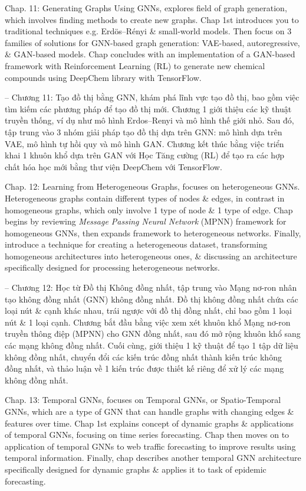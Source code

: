 \documentclass{article}
\begin{document}
\begin{itemize}
\begin{itemize}
        Chap. 11: Generating Graphs Using GNNs, explores field of graph generation, which involves finding methods to create new graphs. Chap 1st introduces you to traditional techniques e.g. Erd\"os--R\'enyi \& small-world models. Then focus on 3 families of solutions for GNN-based graph generation: VAE-based, autoregressive, \& GAN-based models. Chap concludes with an implementation of a GAN-based framework with Reinforcement Learning (RL) to generate new chemical compounds using DeepChem library with TensorFlow.

        -- Chương 11: Tạo đồ thị bằng GNN, khám phá lĩnh vực tạo đồ thị, bao gồm việc tìm kiếm các phương pháp để tạo đồ thị mới. Chương 1 giới thiệu các kỹ thuật truyền thống, ví dụ như mô hình Erdos--Renyi và mô hình thế giới nhỏ. Sau đó, tập trung vào 3 nhóm giải pháp tạo đồ thị dựa trên GNN: mô hình dựa trên VAE, mô hình tự hồi quy và mô hình GAN. Chương kết thúc bằng việc triển khai 1 khuôn khổ dựa trên GAN với Học Tăng cường (RL) để tạo ra các hợp chất hóa học mới bằng thư viện DeepChem với TensorFlow.

        Chap. 12: Learning from Heterogeneous Graphs, focuses on heterogeneous GNNs. Heterogeneous graphs contain different types of nodes \& edges, in contrast in homogeneous graphs, which only involve 1 type of node \& 1 type of edge. Chap begins by reviewing {\it Message Passing Neural Network} (MPNN) framework for homogeneous GNNs, then expands framework to heterogeneous networks. Finally, introduce a technique for creating a heterogeneous dataset, transforming homogeneous architectures into heterogeneous ones, \& discussing an architecture specifically designed for processing heterogeneous networks.

        -- Chương 12: Học từ Đồ thị Không đồng nhất, tập trung vào Mạng nơ-ron nhân tạo không đồng nhất (GNN) không đồng nhất. Đồ thị không đồng nhất chứa các loại nút \& cạnh khác nhau, trái ngược với đồ thị đồng nhất, chỉ bao gồm 1 loại nút \& 1 loại cạnh. Chương bắt đầu bằng việc xem xét khuôn khổ Mạng nơ-ron truyền thông điệp (MPNN) cho GNN đồng nhất, sau đó mở rộng khuôn khổ sang các mạng không đồng nhất. Cuối cùng, giới thiệu 1 kỹ thuật để tạo 1 tập dữ liệu không đồng nhất, chuyển đổi các kiến trúc đồng nhất thành kiến trúc không đồng nhất, và thảo luận về 1 kiến trúc được thiết kế riêng để xử lý các mạng không đồng nhất.

        Chap. 13: Temporal GNNs, focuses on Temporal GNNs, or Spatio-Temporal GNNs, which are a type of GNN that can handle graphs with changing edges \& features over time. Chap 1st explains concept of dynamic graphs \& applications of temporal GNNs, focusing on time series forecasting. Chap then moves on to application of temporal GNNs to web traffic forecasting to improve results using temporal information. Finally, chap describes another temporal GNN architecture specifically designed for dynamic graphs \& applies it to task of epidemic forecasting.


\end{itemize}
\end{itemize}
\end{document}
